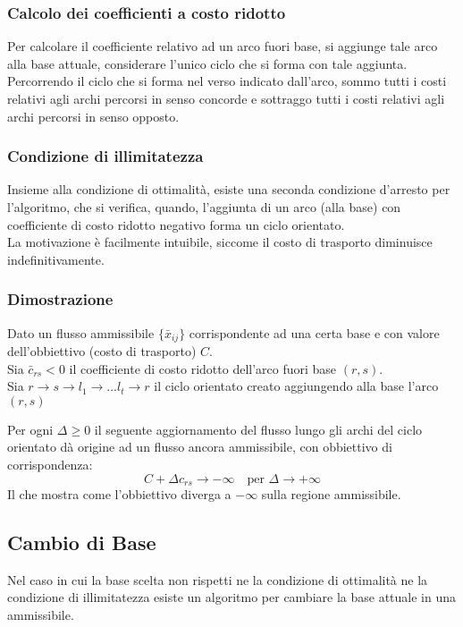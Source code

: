 \documentclass[../template]{subfiles}
\begin{document}
\subsubsection{Calcolo dei coefficienti a costo ridotto}
Per calcolare il coefficiente relativo ad un arco fuori base, si aggiunge tale arco alla base attuale,
considerare l'unico ciclo che si forma con tale aggiunta.
Percorrendo il ciclo che si forma nel verso indicato dall'arco, sommo tutti i costi relativi agli archi
percorsi in senso concorde e sottraggo tutti i costi relativi agli archi percorsi in senso opposto.

\subsubsection{Condizione di illimitatezza}
Insieme alla condizione di ottimalità, esiste una seconda condizione d'arresto per l'algoritmo,
che si verifica, quando, l'aggiunta di un arco (alla base) con coefficiente di costo ridotto negativo
forma un ciclo orientato.
\\
La motivazione è facilmente intuibile, siccome il costo di trasporto diminuisce indefinitivamente.

\subsubsection{Dimostrazione}
Dato un flusso ammissibile $\{\bar{x}_{ij}\}$ corrispondente ad una certa base e con valore dell'obbiettivo
(costo di trasporto) $C$.
\\
Sia $\bar{c}_{rs} < 0$ il coefficiente di costo ridotto dell'arco fuori base $(r, s)$.
\\
Sia $r \to s \to l_1 \to \dots l_t \to r$ il ciclo orientato creato aggiungendo alla base l'arco $(r, s)$

Per ogni $\Delta \ge 0$ il seguente aggiornamento del flusso lungo gli archi del ciclo orientato dà origine
ad un flusso ancora ammissibile, con obbiettivo di corrispondenza:
\[
    C + \Delta c_{rs} \to -\infty \quad \text{per}\,\, \Delta \to +\infty
\]
Il che mostra come l'obbiettivo diverga a $-\infty$ sulla regione ammissibile.
\subsection{Cambio di Base}
Nel caso in cui la base scelta non rispetti ne la condizione di ottimalità ne la condizione di illimitatezza
esiste un algoritmo per cambiare la base attuale in una ammissibile.
\end{document}
